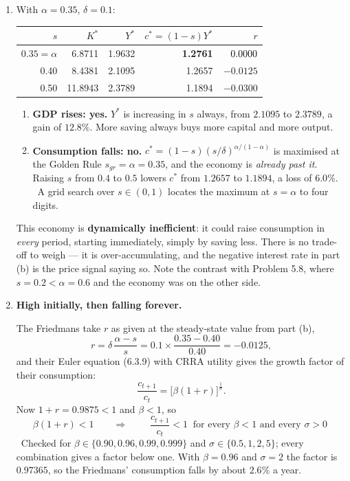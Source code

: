 \documentclass[12pt, letterpaper]{article}
\newcommand{\stst}{^{\ast}}
\begin{document}
\begin{tcolorbox}[oddbox,title={Problem 6.7 \quad One Rational Household}]
\begin{enumerate}
\item With $\alpha=0.35$, $\delta=0.1$:
\begin{center}
\begin{tabular}{@{}rrrrr@{}}
\toprule
$s$ & $K\stst$ & $Y\stst$ & $c\stst=(1-s)Y\stst$ & $r$ \\
\midrule
$0.35=\alpha$ & 6.8711 & 1.9632 & \textbf{1.2761} & $\hphantom{+}0.0000$ \\
0.40 & 8.4381 & 2.1095 & 1.2657 & $-0.0125$ \\
0.50 & 11.8943 & 2.3789 & 1.1894 & $-0.0300$ \\
\bottomrule
\end{tabular}
\end{center}
\checkmark

\begin{enumerate}[label=(\roman*),leftmargin=1.9em,itemsep=4pt,topsep=3pt]
\item \textbf{GDP rises: yes.} $Y\stst$ is increasing in $s$ always, from $2.1095$ to
      $2.3789$, a gain of $12.8\%$. More saving always buys more capital and more output.

\item \textbf{Consumption falls: no.} $c\stst=(1-s)(s/\delta)^{\alpha/(1-\alpha)}$ is
      maximised at the Golden Rule $s_{gr}=\alpha=0.35$, and the economy is \emph{already
      past it}. Raising $s$ from $0.4$ to $0.5$ lowers $c\stst$ from $1.2657$ to $1.1894$, a
      loss of $6.0\%$.
      \checkmark\ A grid search over $s\in(0,1)$ locates the maximum at $s=\alpha$ to four
      digits.
\end{enumerate}

\smallskip
This economy is \textbf{dynamically inefficient}: it could raise consumption in \emph{every}
period, starting immediately, simply by saving less. There is no trade-off to weigh --- it is
over-accumulating, and the negative interest rate in part (b) is the price signal saying so.
Note the contrast with Problem 5.8, where $s=0.2<\alpha=0.6$ and the economy was on the other
side.

\item \textbf{High initially, then falling forever.}

\smallskip
The Friedmans take $r$ as given at the steady-state value from part (b),
\[
r=\delta\,\frac{\alpha-s}{s}=0.1\times\frac{0.35-0.40}{0.40}=-0.0125 ,
\]
and their Euler equation (6.3.9) with CRRA utility gives the growth factor of their
consumption:
\[
\frac{c_{t+1}}{c_t}=\bigl[\beta(1+r)\bigr]^{\frac{1}{\sigma}} .
\]
Now $1+r=0.9875<1$ and $\beta<1$, so
\[
\beta(1+r)<1
\qquad\Longrightarrow\qquad
\boxed{\;\frac{c_{t+1}}{c_t}<1\ \text{ for every }\beta<1\text{ and every }\sigma>0\;}
\]
\checkmark\ Checked for $\beta\in\{0.90,0.96,0.99,0.999\}$ and
$\sigma\in\{0.5,1,2,5\}$; every combination gives a factor below one. With $\beta=0.96$ and
$\sigma=2$ the factor is $0.97365$, so the Friedmans' consumption falls by about
$2.6\%$ a year.


\end{enumerate}
\end{tcolorbox}
\end{document}
